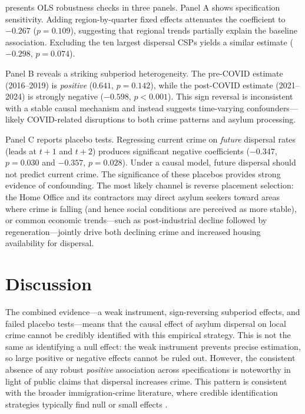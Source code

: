 \documentclass[12pt]{article}
\begin{document}
 presents OLS robustness checks in three panels. Panel A shows specification sensitivity. Adding region-by-quarter fixed effects attenuates the coefficient to $-0.267$ ($p = 0.109$), suggesting that regional trends partially explain the baseline association. Excluding the ten largest dispersal CSPs yields a similar estimate ($-0.298$, $p = 0.074$).

Panel B reveals a striking subperiod heterogeneity. The pre-COVID estimate (2016--2019) is \textit{positive} ($0.641$, $p = 0.142$), while the post-COVID estimate (2021--2024) is strongly negative ($-0.598$, $p < 0.001$). This sign reversal is inconsistent with a stable causal mechanism and instead suggests time-varying confounders---likely COVID-related disruptions to both crime patterns and asylum processing.

Panel C reports placebo tests. Regressing current crime on \textit{future} dispersal rates (leads at $t+1$ and $t+2$) produces significant negative coefficients ($-0.347$, $p = 0.030$ and $-0.357$, $p = 0.028$). Under a causal model, future dispersal should not predict current crime. The significance of these placebos provides strong evidence of confounding. The most likely channel is reverse placement selection: the Home Office and its contractors may direct asylum seekers toward areas where crime is falling (and hence social conditions are perceived as more stable), or common economic trends---such as post-industrial decline followed by regeneration---jointly drive both declining crime and increased housing availability for dispersal.




\section{Discussion}

The combined evidence---a weak instrument, sign-reversing subperiod effects, and failed placebo tests---means that the causal effect of asylum dispersal on local crime cannot be credibly identified with this empirical strategy. This is not the same as identifying a null effect: the weak instrument prevents precise estimation, so large positive or negative effects cannot be ruled out. However, the consistent absence of any robust \textit{positive} association across specifications is noteworthy in light of public claims that dispersal increases crime. This pattern is consistent with the broader immigration-crime literature, where credible identification strategies typically find null or small effects \citep{bell2013crime, bianchi2012immigration, butcher1998immigration, moehling2009immigration}.
\end{document}
